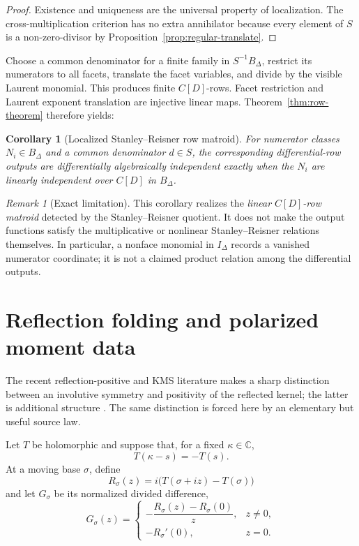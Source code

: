 \documentclass[11pt]{article}
\newtheorem{corollary}[theorem]{Corollary}
\theoremstyle{definition}
\theoremstyle{remark}
\newtheorem{remark}[theorem]{Remark}
\newcommand{\C}{\mathbb C}
\begin{document}
\begin{proof}
Existence and uniqueness are the universal property of localization.  The cross-multiplication
criterion has no extra annihilator because every element of \(S\) is a non-zero-divisor by
Proposition~\ref{prop:regular-translate}.
\end{proof}

Choose a common denominator for a finite family in \(S^{-1}B_\Delta\), restrict its
numerators to all facets, translate the facet variables, and divide by the visible Laurent
monomial.  This produces finite \(C[D]\)-rows.  Facet restriction and Laurent exponent
translation are injective linear maps.  Theorem~\ref{thm:row-theorem} therefore yields:

\begin{corollary}[Localized Stanley--Reisner row matroid]
For numerator classes \(N_i\in B_\Delta\) and a common denominator \(d\in S\), the
corresponding differential-row outputs are differentially algebraically independent exactly
when the \(N_i\) are linearly independent over \(C[D]\) in \(B_\Delta\).
\end{corollary}

\begin{remark}[Exact limitation]
This corollary realizes the \emph{linear \(C[D]\)-row matroid} detected by the
Stanley--Reisner quotient.  It does not make the output functions satisfy the multiplicative
or nonlinear Stanley--Reisner relations themselves.  In particular, a nonface monomial in
\(I_\Delta\) records a vanished numerator coordinate; it is not a claimed product relation
among the differential outputs.
\end{remark}

\section{Reflection folding and polarized moment data}
\label{sec:reflection}

The recent reflection-positive and KMS literature makes a sharp distinction between an
involutive symmetry and positivity of the reflected kernel; the latter is additional structure
\cite{NeebOlafsson2019,AdamoNeebSchober2021}.  The same distinction is forced here by an
elementary but useful source law.

Let \(T\) be holomorphic and suppose that, for a fixed \(\kappa\in\C\),
\begin{equation}\label{eq:anti-reflection}
  T(\kappa-s)=-T(s).
\end{equation}
At a moving base \(\sigma\), define
\[
  R_\sigma(z)=i\bigl(T(\sigma+iz)-T(\sigma)\bigr)
\]
and let \(G_\sigma\) be its normalized divided difference,
\[
  G_\sigma(z)=
  \begin{cases}
    -\dfrac{R_\sigma(z)-R_\sigma(0)}{z},&z\neq0,\\[1.1ex]
    -R_\sigma'(0),&z=0.
  \end{cases}
\]
\end{document}

